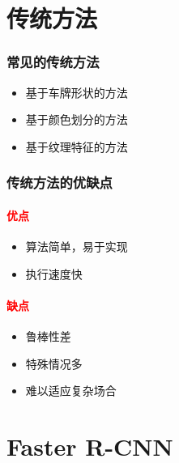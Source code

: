 \documentclass[UTF8]{beamer}
\begin{document}
\section{传统方法}

\begin{frame}
  \frametitle{常见的传统方法}
  \begin{itemize}
    \item 基于车牌形状的方法
    \item 基于颜色划分的方法
    \item 基于纹理特征的方法
  \end{itemize}
\end{frame}

\begin{frame}
  \frametitle{传统方法的优缺点}
  
  \textcolor{red}{\paragraph{优点}}
  \begin{itemize}
    \item 算法简单，易于实现
    \item 执行速度快
  \end{itemize} 

  \textcolor{red}{\paragraph{缺点}}
  \begin{itemize}
    \item 鲁棒性差
    \item 特殊情况多
    \item 难以适应复杂场合
  \end{itemize}
\end{frame}

\section{Faster R-CNN}
\end{document}
